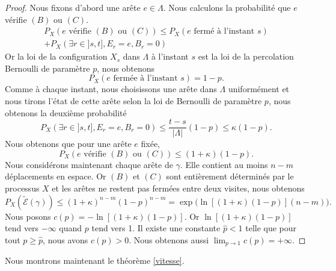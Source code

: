 \documentclass[titlepage,a4paper,12pt]{article}
\newcounter{th}
\begin{document}
\begin{proof}
Nous fixons d'abord une arête $e\in \Lambda$. Nous calculons la probabilité que $e$ vérifie $(B)$ ou $(C)$.
\begin{multline*}P_X(e \text{ vérifie }(B) \text{ ou }(C))\leqslant P_X(e \text{ fermé à l'instant } s)\\+P_X(\exists r \in ]s,t], E_r = e, B_r = 0)
\end{multline*}
Or la loi de la configuration $X_s$ dans $\Lambda$ à l'instant $s$ est la loi de la percolation Bernoulli de paramètre $p$, nous obtenons $$P_X(e \text{ fermée à l'instant } s) = 1-p.$$
Comme à chaque instant, nous choisissons une arête dans $\Lambda$ uniformément et nous tirons l'état de cette arête selon la loi de Bernoulli de paramètre $p$, nous obtenons la deuxième probabilité
$$ P_X(\exists r \in ]s,t], E_r = e, B_r = 0) \leqslant \frac{t-s}{|\Lambda|}(1-p)\leqslant \kappa(1-p).
$$
Nous obtenons que pour une arête $e$ fixée, $$P_X(e \text{ vérifie }(B) \text{ ou }(C))\leqslant (1+\kappa)(1-p).$$
Nous considérons maintenant chaque arête de $\gamma$. Elle contient au moins $n-m$ déplacements en espace. Or $(B)$ et $(C)$ sont entièrement déterminés par le processus $X$ et les arêtes ne restent pas fermées entre deux visites, nous obtenons 
$$P_X(\tilde{\mathcal{E}}(\gamma))\leqslant (1+\kappa)^{n-m}(1-p)^{n-m} = \exp\big(\ln[(1+\kappa)(1-p)](n-m)\big).
$$ 
Nous posons $c(p) = -\ln[(1+\kappa)(1-p)]$. Or $\ln[(1+\kappa)(1-p)]$ tend vers $-\infty$ quand $p$ tend vers 1. Il existe une constante $\hat{p}<1$ telle que pour tout $p\geqslant \hat{p}$, nous avons $c(p)>0$. Nous obtenons aussi 
$ \lim_{p\rightarrow 1}c(p) = +\infty
$.
\end{proof}
Nous montrons maintenant le théorème \ref{vitesse}. 
\end{document}
